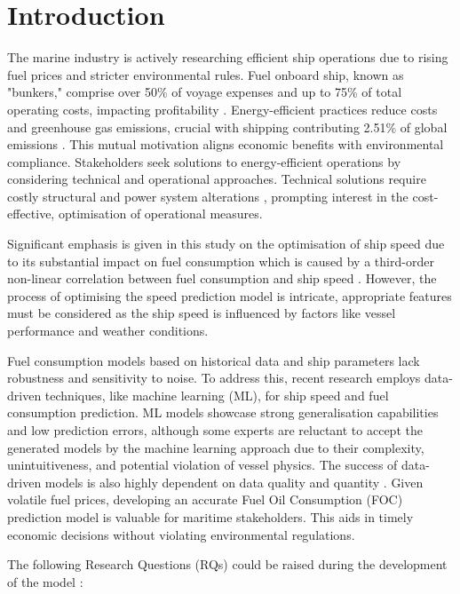 \documentclass[]{interact}
\theoremstyle{plain}%
\theoremstyle{definition}
\theoremstyle{remark}
\begin{document}
\section{Introduction}

The marine industry is actively researching efficient ship operations due to rising fuel prices and stricter environmental rules. Fuel onboard ship, known as "bunkers," comprise over 50\% of voyage expenses and up to 75\% of total operating costs, impacting profitability \citep{Bialystocki.2016}. Energy-efficient practices reduce costs and greenhouse gas emissions, crucial with shipping contributing 2.51\% of global emissions \citep{IMO.2020}. This mutual motivation aligns economic benefits with environmental compliance. Stakeholders seek solutions to energy-efficient operations by considering technical and operational approaches. Technical solutions require costly structural and power system alterations \citep{Yan.2021,Li.2022}, prompting interest in the cost-effective, optimisation of operational measures.

Significant emphasis is given in this study on the optimisation of ship speed due to its substantial impact on fuel consumption which is caused by a third-order non-linear correlation between fuel consumption and ship speed \citep{Wang.2012,Du.2019}. However, the process of optimising the speed prediction model is intricate, appropriate features must be considered as the ship speed is influenced by factors like vessel performance and weather conditions.

Fuel consumption models based on historical data and ship parameters lack robustness and sensitivity to noise. To address this, recent research employs data-driven techniques, like machine learning (ML), for ship speed and fuel consumption prediction. ML models showcase strong generalisation capabilities and low prediction errors, although some experts are reluctant to accept the generated models by the machine learning approach due to their complexity, unintuitiveness, and potential violation of vessel physics. The success of data-driven models is also highly dependent on data quality and quantity \citep{Yan.2021,Gkerekos.2019}. Given volatile fuel prices, developing an accurate Fuel Oil Consumption (FOC) prediction model is valuable for maritime stakeholders. This aids in timely economic decisions without violating environmental regulations.

The following Research Questions (RQs) could be raised during the development of the model :
\end{document}
